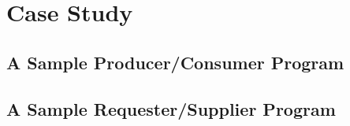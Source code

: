 \chapter{Case Study}\label{chapter:case_study}

\section{A Sample Producer/Consumer Program}

\section{A Sample Requester/Supplier Program}
